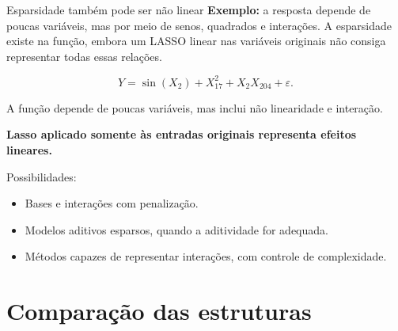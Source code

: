 \documentclass[
  10pt,
  ignorenonframetext,
  aspectratio=169,
  brazilian,
]{beamer}
\providecommand{\tightlist}{%
  \setlength{\itemsep}{0pt}\setlength{\parskip}{0pt}}
\begin{document}
\begin{frame}{Esparsidade também pode ser não linear}
\protect{}\label{esparsidade-tambuxe9m-pode-ser-nuxe3o-linear}
\textbf{Exemplo:} a resposta depende de poucas variáveis, mas por meio
de senos, quadrados e interações. A esparsidade existe na função, embora
um LASSO linear nas variáveis originais não consiga representar todas
essas relações.

\[
Y=\sin(X_2)+X_{17}^2+X_2X_{204}+\varepsilon.
\]

A função depende de poucas variáveis, mas inclui não linearidade e
interação.

\textbf{Lasso aplicado somente às entradas originais representa efeitos
lineares.}

Possibilidades:

\begin{itemize}
\tightlist
\item
  Bases e interações com penalização.
\item
  Modelos aditivos esparsos, quando a aditividade for adequada.
\item
  Métodos capazes de representar interações, com controle de
  complexidade.
\end{itemize}
\end{frame}

\section{Comparação das
estruturas}\label{comparauxe7uxe3o-das-estruturas}
\end{document}
